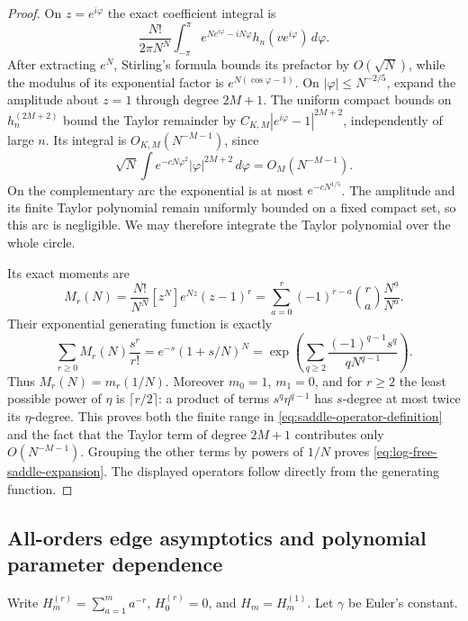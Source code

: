 \documentclass[11pt]{article}
\numberwithin{equation}{section}
\theoremstyle{definition}
\theoremstyle{remark}
\begin{document}
\begin{proof}
On $z=e^{i\varphi}$ the exact coefficient integral is
\[
 \frac{N!}{2\pi N^N}\int_{-\pi}^{\pi}
       e^{N e^{i\varphi}-iN\varphi}h_n(ve^{i\varphi})\,d\varphi.
\]
After extracting $e^N$, Stirling's formula bounds its prefactor by
$O(\sqrt N)$, while the modulus of its exponential factor is
$e^{N(\cos\varphi-1)}$.  On $|\varphi|\leq N^{-2/5}$, expand the
amplitude about $z=1$ through degree $2M+1$.  The uniform compact
bounds on $h_n^{(2M+2)}$ bound the Taylor remainder by
$C_{K,M}|e^{i\varphi}-1|^{2M+2}$, independently of large $n$.
Its integral is $O_{K,M}(N^{-M-1})$, since
\[
 \sqrt N\int e^{-cN\varphi^2}|\varphi|^{2M+2}\,d\varphi
            =O_M(N^{-M-1}).
\]
On the complementary arc the exponential is at most
$e^{-cN^{1/5}}$.  The amplitude and its finite Taylor polynomial
remain uniformly bounded on a fixed compact set, so this arc is
negligible.  We may therefore integrate the Taylor polynomial over
the whole circle.

Its exact moments are
\[
 M_r(N)=\frac{N!}{N^N}[z^N]e^{Nz}(z-1)^r
       =\sum_{a=0}^r(-1)^{r-a}\binom ra
            \frac{N^{\underline a}}{N^a}.
\]
Their exponential generating function is exactly
\[
 \sum_{r\geq0}M_r(N)\frac{s^r}{r!}
       =e^{-s}(1+s/N)^N
       =\exp\left(\sum_{q\geq2}
               \frac{(-1)^{q-1}s^q}{qN^{q-1}}\right).
\]
Thus $M_r(N)=m_r(1/N)$.  Moreover $m_0=1$, $m_1=0$, and for
$r\geq2$ the least possible power of $\eta$ is $\lceil r/2\rceil$:
a product of terms $s^q\eta^{q-1}$ has $s$-degree at most twice
its $\eta$-degree.  This proves both the finite range in
\eqref{eq:saddle-operator-definition} and the fact that the
Taylor term of degree $2M+1$ contributes only $O(N^{-M-1})$.
Grouping the other terms by powers of $1/N$ proves
\eqref{eq:log-free-saddle-expansion}.  The displayed operators
follow directly from the generating function.
\end{proof}

\subsection{All-orders edge asymptotics and polynomial parameter dependence}

Write $H_m^{(r)}=\sum_{a=1}^m a^{-r}$, $H_0^{(r)}=0$, and
$H_m=H_m^{(1)}$.  Let $\gamma$ be Euler's constant.
\end{document}
